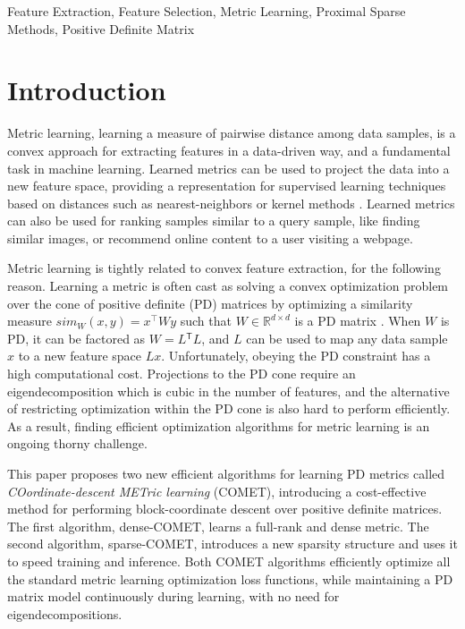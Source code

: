 \documentclass[twoside,11pt]{article}
\newcommand\mat[1]{{#1}}
\newcommand{\T}{{}^\mathsf{T}}
\newcommand{\W}{\mat{W}}
\newcommand{\R}{\mathbb{R}}
\newcommand{\cholL}{\mat{L}}
\begin{document}
\begin{keywords}
  Feature Extraction, Feature Selection, Metric Learning, Proximal Sparse Methods, Positive Definite Matrix 
\end{keywords}

\section{Introduction}
Metric learning, learning a measure of pairwise distance among data samples, is a convex approach for extracting features in a data-driven way, and a fundamental task in machine learning. Learned metrics can be used to project the data into a new feature space, providing a representation for supervised learning techniques based on distances such as nearest-neighbors or kernel methods \citep{kulis2012survey}.
Learned metrics can also be used for ranking samples similar to a query sample, like finding similar images, or recommend online content to a user visiting a webpage. 

Metric learning is tightly related to convex feature extraction, for the following reason. Learning a metric is often cast as solving a convex optimization problem over the cone of positive definite (PD) matrices by optimizing a similarity measure $sim_W (x,y) = x^\top W y$ such that $W \in \R^{d \times d}$ is a PD matrix  \citep{kulis2012survey,bellet2013survey}. 
When $\W$ is PD, it can be factored as $\W= \cholL\T \cholL$, and $\cholL$ can be used to map any data sample $x$ to a new feature space $\cholL x$. Unfortunately, obeying the PD constraint has a high computational cost. Projections to the PD cone require an eigendecomposition which is cubic in the number of features, and the alternative of restricting optimization within the PD cone is also hard to perform efficiently. As a result, finding efficient optimization algorithms for metric learning is an ongoing thorny challenge. 

This paper proposes two new efficient algorithms for learning PD metrics called {\em{COordinate-descent METric learning}} (COMET), introducing a cost-effective method for performing block-coordinate descent over positive definite matrices. The first algorithm, dense-COMET, learns a full-rank and dense metric. The second algorithm, sparse-COMET, introduces a new sparsity structure and uses it to speed training and inference. Both COMET algorithms  efficiently optimize all the standard metric learning optimization loss functions, while maintaining a PD matrix model continuously during learning, with no need for eigendecompositions. 
\end{document}
